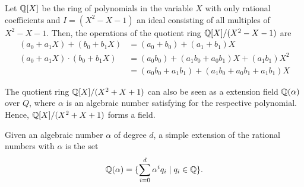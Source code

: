 \begin{example}
  Let ${\mathbb Q}[X]$ be the ring of polynomials in the variable $X$ with only rational
  coefficients and $I = (X^2 - X - 1)$ an ideal consisting of all multiples of $X^2 - X - 1$.
  Then, the operations of the quotient ring ${\mathbb Q}[X]/(X^2 - X - 1)$ are
  \begin{align*}
    (a_0 + a_1 X) + (b_0 + b_1 X)
    & = (a_0 + b_0) + (a_1 + b_1) X \\
    (a_0 + a_1 X) \cdot (b_0 + b_1 X)
    & = (a_0 b_0) + (a_1 b_0 + a_0 b_1) X + (a_1 b_1) X^2 \\
    & = (a_0 b_0 + a_1 b_1) + (a_1 b_0 + a_0 b_1 + a_1 b_1) X
  \end{align*}
\end{example}

The quotient ring ${\mathbb Q}[X]/(X^2 + X + 1)$ can also be seen as a extension field ${\mathbb Q}(\alpha)$ over $Q$,
where $\alpha$ is an algebraic number satisfying for the respective polynomial.
Hence, ${\mathbb Q}[X]/(X^2 + X + 1)$ forms a field.

\begin{definition}
  Given an algebraic number $\alpha$ of degree $d$,
  a simple extension of the rational numbers with $\alpha$ is the set
  \[
    {\mathbb Q}(\alpha) = \{\sum_{i=0}^d \alpha^i q_i \mid q_i \in {\mathbb Q}\}.
  \]
\end{definition}

